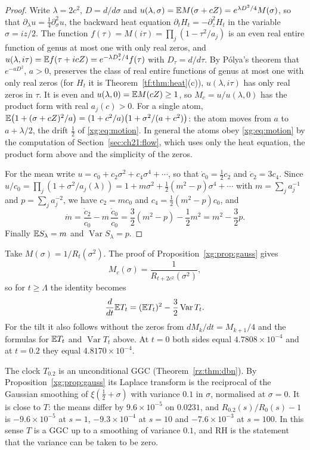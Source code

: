 \begin{proof}
Write $\lambda=2c^2$, $D=d/d\sigma$ and $u(\lambda,\sigma)=\mathbb{E} M(\sigma+cZ)=e^{\lambda D^2/4}M(\sigma)$, so that $\partial_\lambda u=\frac14\partial_\sigma^2u$, the backward heat equation $\partial_tH_t=-\partial_z^2H_t$ in the variable $\sigma=iz/2$. The function $f(\tau)=M(i\tau)=\prod_j(1-\tau^2/a_j)$ is an even real entire function of genus at most one with only real zeros, and $u(\lambda,i\tau)=\mathbb{E} f(\tau+icZ)=e^{-\lambda D_\tau^2/4}f(\tau)$ with $D_\tau=d/d\tau$. By P\'olya's theorem that $e^{-aD^2}$, $a>0$, preserves the class of real entire functions of genus at most one with only real zeros \cite{Polya27} (for $H_t$ it is Theorem~\ref{tf:thm:heat}(c)), $u(\lambda,i\tau)$ has only real zeros in $\tau$. It is even and $u(\lambda,0)=\mathbb{E} M(cZ)\ge1$, so $M_c=u/u(\lambda,0)$ has the product form with real $a_j(c)>0$. For a single atom, $\mathbb{E}\big(1+(\sigma+cZ)^2/a\big)=(1+c^2/a)\big(1+\sigma^2/(a+c^2)\big)$: the atom moves from $a$ to $a+\lambda/2$, the drift $\frac12$ of \eqref{xg:eq:motion}. In general the atoms obey \eqref{xg:eq:motion} by the computation of Section~\ref{sec:ch21:flow}, which uses only the heat equation, the product form above and the simplicity of the zeros.

For the mean write $u=c_0+c_2\sigma^2+c_4\sigma^4+\cdots$, so that $\dot c_0=\frac12c_2$ and $\dot c_2=3c_4$. Since $u/c_0=\prod_j(1+\sigma^2/a_j(\lambda))=1+m\sigma^2+\frac12(m^2-p)\sigma^4+\cdots$ with $m=\sum_ja_j^{-1}$ and $p=\sum_ja_j^{-2}$, we have $c_2=mc_0$ and $c_4=\frac12(m^2-p)c_0$, and
\[
\dot m=\frac{\dot c_2}{c_0}-m\,\frac{\dot c_0}{c_0}=\frac32(m^2-p)-\frac12m^2=m^2-\frac32p.
\]
Finally $\mathbb{E} S_\lambda=m$ and $\operatorname{Var}S_\lambda=p$.
\end{proof}

Take $M(\sigma)=1/R_t(\sigma^2)$. The proof of Proposition~\ref{xg:prop:gauss} gives
\[
M_c(\sigma)=\frac1{R_{t+2c^2}(\sigma^2)},
\]
so for $t\ge\Lambda$ the identity becomes
\[
\frac{d}{dt}\mathbb{E} T_t=(\mathbb{E} T_t)^2-\frac32\operatorname{Var}T_t.
\]
For the tilt it also follows without the zeros from $dM_k/dt=M_{k+1}/4$ and the formulas for $\mathbb{E} T_t$ and $\operatorname{Var}T_t$ above. At $t=0$ both sides equal $4.7808\times10^{-4}$ and at $t=0.2$ they equal $4.8170\times10^{-4}$.

The clock $T_{0.2}$ is an unconditional GGC (Theorem~\ref{rz:thm:dbn}). By Proposition~\ref{xg:prop:gauss} its Laplace transform is the reciprocal of the Gaussian smoothing of $\xi(\frac12+\sigma)$ with variance $0.1$ in $\sigma$, normalised at $\sigma=0$. It is close to $T$: the means differ by $9.6\times10^{-5}$ on $0.0231$, and $R_{0.2}(s)/R_0(s)-1$ is $-9.6\times10^{-5}$ at $s=1$, $-9.3\times10^{-4}$ at $s=10$ and $-7.6\times10^{-3}$ at $s=100$. In this sense $T$ is a GGC up to a smoothing of variance $0.1$, and RH is the statement that the variance can be taken to be zero.

